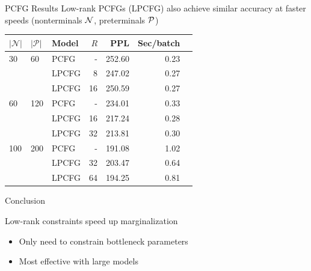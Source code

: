 \documentclass{beamer}
\newlength{\onecolwid}
\begin{document}
\begin{frame}
\begin{columns}[t]
\begin{column}{\onecolwid}
\begin{block}{PCFG Results}
Low-rank PCFGs (LPCFG) also achieve similar accuracy at faster speeds
(nonterminals $\mathcal{N}$, preterminals $\mathcal{P}$)
\begin{table}
\centering
\begin{tabular} {lllrrrr}
\toprule
$|\mathcal{N}|$ & $|\mathcal{P}|$ & Model & $R$ &  PPL & Sec/batch\\ %
\midrule
30  & 60    & PCFG & - & 252.60 &  0.23\\  %
    &       & LPCFG & 8 &  247.02    & 0.27\\ %
    &       & LPCFG & 16 & 250.59    & 0.27\\ %
\midrule
60  & 120   & PCFG & - & 234.01 &  0.33\\ %
    &       & LPCFG & 16& 217.24 & 0.28\\ %
    &       & LPCFG & 32& 213.81 & 0.30\\ %
\midrule
100 & 200   & PCFG & - &  191.08   & 1.02\\ %
    &       & LPCFG & 32& 203.47 & 0.64\\ %
    &       & LPCFG & 64& 194.25 & 0.81\\ %
\bottomrule
\end{tabular}
\end{table}
\end{block}


\begin{block}{Conclusion}

Low-rank constraints speed up marginalization
\begin{itemize}
\item Only need to constrain bottleneck parameters
\item Most effective with large models
\end{itemize}


\end{block}
\end{column}
\end{columns}
\end{frame}
\end{document}
